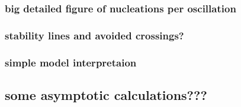 \documentclass[../main/TimeForcingSHE.tex]{subfiles}
\begin{document}
	\subsubsection{big detailed figure of nucleations per oscillation}
	\subsubsection{stability lines and avoided crossings?}
	\subsubsection{simple model interpretaion}

\subsection{some asymptotic calculations???}
\end{document}
